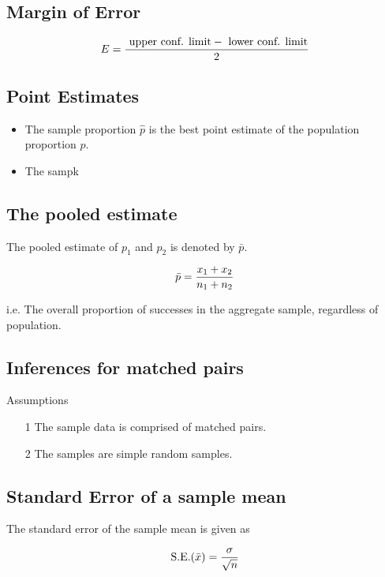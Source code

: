 {
\subsection{Margin of Error}

\[ E = {\mbox{ upper conf. limit} - \mbox{ lower conf. limit} \over 2} \]

\subsection{Point Estimates}
\begin{itemize}
\item The sample proportion $\hat{p}$ is the best point estimate of the population proportion $p$.
\item The sampk
\end{itemize}

\subsection{The pooled estimate}

The pooled estimate of $p_1$ and $p_2$ is denoted by $\bar{p}$.

\[ \bar{p} = { x_1 +  x_2  \over n_1 + n_2 } \]

i.e. The overall proportion of successes in the aggregate sample, regardless of population.


\subsection{Inferences for matched pairs}
Assumptions
\begin{itemize}
\item[1] The sample data is comprised of matched pairs.
\item[2] The samples are simple random samples.
\end{itemize}


{
\subsection{Standard Error of a sample mean}

The standard error of the sample mean is given as

\[  \mbox{S.E.}(\bar{x}) = { \sigma \over \sqrt{n} } \]

}








}
